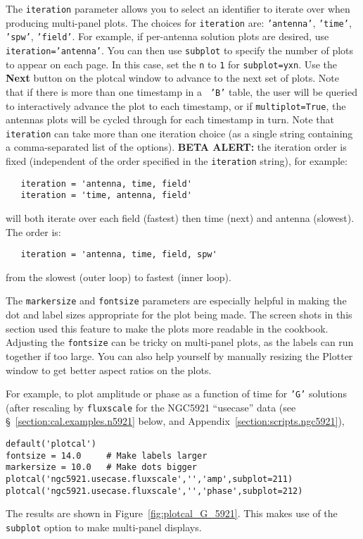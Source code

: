 The {\tt iteration} parameter allows you to select an identifier to
iterate over when producing multi-panel plots.  The choices
for {\tt iteration} are: {\tt 'antenna'}, {\tt 'time'}, 
{\tt 'spw'}, {\tt 'field'}.  For example, if per-antenna solution 
plots are desired, use {\tt iteration='antenna'}.  You can then use
{\tt  subplot} to specify the number of plots to appear on each page.
In this case, set the {\tt n} to {\tt 1} for {\tt subplot=yxn}.  
Use the {\bf Next} button on the plotcal window to advance to the next
set of plots.  Note that if there is more than one timestamp in a {\tt
'B'} table, the user will be queried to interactively advance the plot
to each timestamp, or if {\tt multiplot=True}, the antennas plots will
be cycled through for each timestamp in turn.  Note that 
{\tt iteration} can take more than one iteration choice (as a single
string containing a comma-separated list of the options).
{\bf BETA ALERT:} the iteration order is fixed (independent of the
order specified in the {\tt iteration} string), for example:
\small
\begin{verbatim}
   iteration = 'antenna, time, field'
   iteration = 'time, antenna, field'
\end{verbatim}
\normalsize
will both iterate over each field (fastest) then time (next) and antenna
(slowest).  The order is:
\small
\begin{verbatim}
   iteration = 'antenna, time, field, spw'
\end{verbatim}
\normalsize
from the slowest (outer loop) to fastest (inner loop).

The {\tt markersize} and {\tt fontsize} parameters are especially
helpful in making the dot and label sizes appropriate for the
plot being made.  The screen shots in this section used this feature
to make the plots more readable in the cookbook.  Adjusting the
{\tt fontsize} can be tricky on multi-panel plots, as the labels
can run together if too large.  You can also help yourself by manually
resizing the Plotter window to get better aspect ratios on the plots.

For example, to plot amplitude or phase as a function of time for 
{\tt 'G'} solutions (after rescaling by {\tt fluxscale} for the NGC5921
``usecase'' data (see \S~\ref{section:cal.examples.n5921} below, and 
Appendix~\ref{section:scripts.ngc5921}),
\small
\begin{verbatim}
default('plotcal')
fontsize = 14.0     # Make labels larger
markersize = 10.0   # Make dots bigger
plotcal('ngc5921.usecase.fluxscale','','amp',subplot=211)
plotcal('ngc5921.usecase.fluxscale','','phase',subplot=212)
\end{verbatim}
\normalsize
The results are shown in Figure~\ref{fig:plotcal_G_5921}.  This makes 
use of the {\tt subplot} option to make multi-panel displays.

